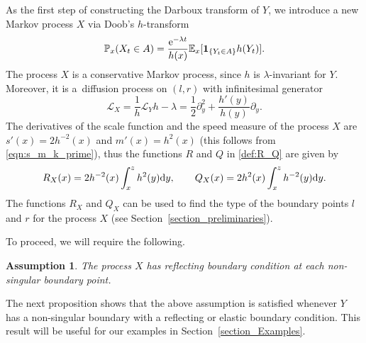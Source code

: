 \documentclass[10pt,a4paper]{amsart}
\numberwithin{equation}{section}
\newtheorem{Assumption}[Theorem]{Assumption}
\theoremstyle{definition}
\def\L{{\mathcal L}}
\def\p{{\mathbb P}}
\def\e{{\mathbb E}}
\def\d{{\textnormal d}}
\begin{document}
As the first step of constructing the Darboux transform of $Y$, we introduce a new Markov process $X$ via Doob's $h$-transform
\begin{equation}\label{X_as_Doobs_transform}
\p_x (X_t \in A)=\frac{{\rm e}^{-\lambda t}}{h(x)}
\e_x[ {\mathbf 1}_{\{Y_t \in A\}} h(Y_t)].
\end{equation}
The process $X$ is a conservative Markov process, since $h$ is $\lambda$-invariant for $Y$. Moreover, it is a~diffusion process on $(l,r)$ with infinitesimal generator
\begin{equation}\label{eqn:L_X}
\L_X=\frac{1}{h} \L_Y h-\lambda=\frac{1}{2} \partial_y^2 + \frac{h'(y)}{h(y)} \partial_y.
\end{equation}
The derivatives of the scale function and the speed measure of the process $X$ are $s'(x)=2h^{-2}(x)$ and $m'(x)=h^2(x)$ (this follows from \eqref{eqn:s_m_k_prime}), thus the functions $R$ and $Q$ in \eqref{def:R_Q} are given by
\begin{equation}\label{R_X_Q_X}
R_X(x)=2 h^{-2}(x) \int_x^z h^2(y) \d y, \qquad
Q_X(x)=2 h^{2}(x) \int_x^z h^{-2}(y) \d y.
\end{equation}
The functions $R_X$ and $Q_X$ can be used to find the type of the boundary points $l$ and $r$ for the process $X$ (see Section~\ref{section_preliminaries}).

To proceed, we will require the following.
\begin{Assumption}\label{Assumption_2}
The process $X$ has reflecting boundary condition at each non-singular boundary point.
\end{Assumption}

The next proposition shows that the above assumption is satisfied whenever $Y$ has a non-singular boundary with a reflecting or elastic boundary condition. This result will be useful for our examples in Section~\ref{section_Examples}.
\end{document}
